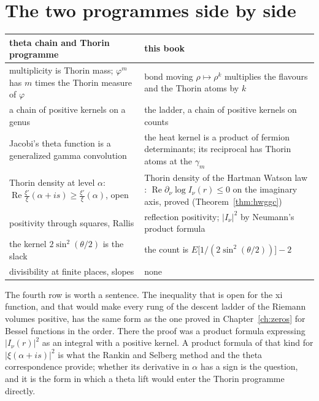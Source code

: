 \section{The two programmes side by side}

\begin{center}
\small
\begin{tabular}{p{}p{}}
\toprule
theta chain and Thorin programme \cite{PS26t} & this book \\ \midrule
multiplicity is Thorin mass; $\varphi^m$ has $m$ times the Thorin measure of $\varphi$ & bond moving $\rho\mapsto\rho^k$ multiplies the flavours and the Thorin atoms by $k$ \\
a chain of positive kernels on a genus & the ladder, a chain of positive kernels on counts \\
Jacobi's theta function is a generalized gamma convolution \cite{BPY,Bo92} & the heat kernel is a product of fermion determinants; its reciprocal has Thorin atoms at the $\gamma_m$ \\
Thorin density at level $\alpha$: $\operatorname{Re}\frac{\xi'}{\xi}(\alpha+is)\ge\frac{\xi'}{\xi}(\alpha)$, open & Thorin density of the Hartman Watson law \cite{HW74}: $\operatorname{Re}\partial_\nu\log I_\nu(r)\le0$ on the imaginary axis, proved (Theorem~\ref{thm:hwggc}) \\
positivity through squares, Rallis & reflection positivity; $|I_\nu|^2$ by Neumann's product formula \\
the kernel $2\sin^2(\theta/2)$ is the slack & the count is $E\big[1/(2\sin^2(\theta/2))\big]-2$ \\
divisibility at finite places, slopes & none \\
\bottomrule
\end{tabular}
\end{center}

The fourth row is worth a sentence. The inequality that is open for the xi function, and that would make every rung of the descent ladder of the Riemann volumes positive, has the same form as the one proved in Chapter~\ref{ch:zeros} for Bessel functions in the order. There the proof was a product formula expressing $|I_\nu(r)|^2$ as an integral with a positive kernel. A product formula of that kind for $|\xi(\alpha+is)|^2$ is what the Rankin and Selberg method and the theta correspondence provide; whether its derivative in $\alpha$ has a sign is the question, and it is the form in which a theta lift would enter the Thorin programme directly.

